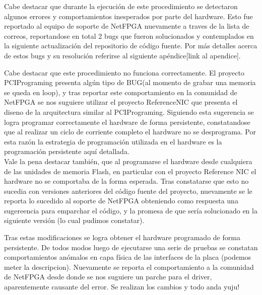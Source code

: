 Cabe destacar que durante la ejecuci\'on de este procedimiento se detectaron algunos errores y comportamientos inesperados por parte del hardware. Esto fue reportado al equipo de soporte de NetFPGA nuevamente a traves de la lista de correos, reportandose en total 2 bugs que fueron solucionados y contemplados en la siguiente actualizaci\'on del repositorio de c\'odigo fuente. Por m\'as detalles acerca de estos bugs y su resoluci\'on referirse al siguiente ap\'endice[link al apendice].

Cabe destacar que este procedimiento no funciona correctamente. El proyecto PCIPrograming presenta alg\'un tipo de BUG(al momento de grabar una memoria se queda en loop), y tras reportar este comportamiento en la comunidad de NetFPGA se nos suguiere utilizar el proyecto ReferenceNIC que presenta el diseno de la arquitectura similar al PCIPrograming. Siguiendo esta sugerencia se logra programar correctamente el hardware de forma persistente, constatandose que al realizar un ciclo de corriente completo el hardware no se desprograma. Por esta raz\'on la estrategia de programaci\'on utilizada en el hardware es la programaci\'on persistente aqu\'i detallada.\\

Vale la pena destacar tambi\'en, que al programarse el hardware desde cualquiera de las unidades de memoria Flash, en particular con el proyecto Reference NIC el hardware no se comportaba de la forma esperada. Tras constatarse que esto no sucedia con versiones anteriores del c\'odigo fuente del proyecto, nuevamente se le reporta lo sucedido al soporte de NetFPGA obteniendo como respuesta una sugereencia para emparchar el c\'odigo, y la promesa de que ser\'ia solucionado en la siguiente versi\'on (lo cual pudimos constatar).

Tras estas modificaciones se logra obtener el hardware programado de forma persistente. De todos modos luego de ejecutarse una serie de pruebas se constatan comportamientos an\'omalos en capa f\'isica de las interfaces de la placa (podemos meter la descripcion). Nuevamente se reporta el comportamiento a la comunidad de NetFPGA desde donde se nos suguiere un parche para el driver, aparentemente causante del error. Se realizan los cambios y todo anda yuju!  


